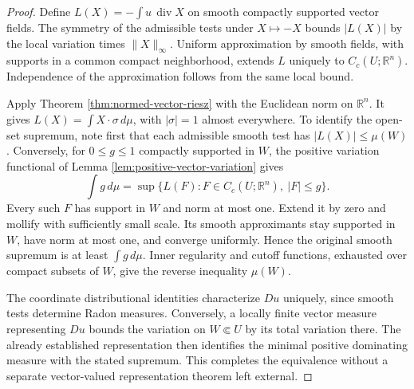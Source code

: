 \begin{proof}
Define $L(X)=-\int u\,\operatorname{div}X$ on smooth compactly supported vector fields. The symmetry of the admissible tests under $X\mapsto-X$ bounds $|L(X)|$ by the local variation times $\|X\|_\infty$. Uniform approximation by smooth fields, with supports in a common compact neighborhood, extends $L$ uniquely to $C_c(U;\mathbb R^n)$. Independence of the approximation follows from the same local bound.

Apply Theorem \ref{thm:normed-vector-riesz} with the Euclidean norm on $\mathbb R^n$. It gives $L(X)=\int X\cdot\sigma\,d\mu$, with $|\sigma|=1$ almost everywhere. To identify the open-set supremum, note first that each admissible smooth test has $|L(X)|\leq\mu(W)$. Conversely, for $0\leq g\leq1$ compactly supported in $W$, the positive variation functional of Lemma \ref{lem:positive-vector-variation} gives
\[
 \int g\,d\mu=\sup\{L(F):F\in C_c(U;\mathbb R^n),\ |F|\leq g\}.
\]
Every such $F$ has support in $W$ and norm at most one. Extend it by zero and mollify with sufficiently small scale. Its smooth approximants stay supported in $W$, have norm at most one, and converge uniformly. Hence the original smooth supremum is at least $\int g\,d\mu$. Inner regularity and cutoff functions, exhausted over compact subsets of $W$, give the reverse inequality $\mu(W)$.

The coordinate distributional identities characterize $Du$ uniquely, since smooth tests determine Radon measures. Conversely, a locally finite vector measure representing $Du$ bounds the variation on $W\Subset U$ by its total variation there. The already established representation then identifies the minimal positive dominating measure with the stated supremum. This completes the equivalence without a separate vector-valued representation theorem left external.
\end{proof}

